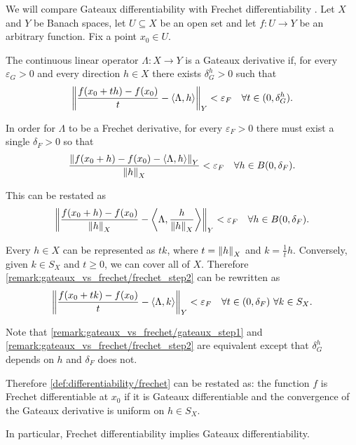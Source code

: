 \begin{remark}\label{remark:gateaux_vs_frechet}
  We will compare Gateaux differentiability with Frechet differentiability . Let \( X \) and \( Y \) be Banach spaces, let \( U \subseteq X \) be an open set and let \( f: U \to Y \) be an arbitrary function. Fix a point \( x_0 \in U \).

  The continuous linear operator \( \Lambda: X \to Y \) is a Gateaux derivative if, for every \( \varepsilon_G > 0 \) and every direction \( h \in X \) there exists \( \delta_G^h > 0 \) such that
  \begin{equation}\label{remark:gateaux_vs_frechet/gateaux_step1}
    \left\Vert \frac {f(x_0 + th) - f(x_0)} t - \left\langle \Lambda, h \right\rangle \right\Vert_Y < \varepsilon_F \quad\forall t \in (0, \delta_G^h).
  \end{equation}

  In order for \( \Lambda \) to be a Frechet derivative, for every \( \varepsilon_F > 0 \) there must exist a single \( \delta_F > 0 \) so that
  \begin{equation}\label{remark:gateaux_vs_frechet/frechet_step1}
    \frac{\left\Vert f(x_0 + h) - f(x_0) - \left\langle \Lambda, h \right\rangle \right\Vert_Y} {\left\Vert h \right\Vert_X} < \varepsilon_F \quad\forall h \in B(0, \delta_F).
  \end{equation}

  This can be restated as
  \begin{equation}\label{remark:gateaux_vs_frechet/frechet_step2}
    \left\Vert \frac {f(x_0 + h) - f(x_0)} {\left\Vert h \right\Vert_X} - \left\langle \Lambda, \frac {h} {\left\Vert h \right\Vert_X} \right\rangle \right\Vert_Y < \varepsilon_F \quad\forall h \in B(0, \delta_F).
  \end{equation}

  Every \( h \in X \) can be represented as \( t k \), where \( t = \left\Vert h \right\Vert_X \) and \( k = \tfrac 1 t h \). Conversely, given \( k \in S_X \) and \( t \geq 0 \), we can cover all of \( X \). Therefore \cref{remark:gateaux_vs_frechet/frechet_step2} can be rewritten as
  \begin{equation}\label{remark:gateaux_vs_frechet/frechet_step3}
    \left\Vert \frac {f(x_0 + tk) - f(x_0)} t - \left\langle \Lambda, k \right\rangle \right\Vert_Y < \varepsilon_F \quad\forall t \in (0, \delta_F) \ \forall k \in S_X.
  \end{equation}

  Note that \cref{remark:gateaux_vs_frechet/gateaux_step1} and \cref{remark:gateaux_vs_frechet/frechet_step2} are equivalent except that \( \delta_G^h \) depends on \( h \) and \( \delta_F \) does not.

  Therefore \cref{def:differentiability/frechet} can be restated as: the function \( f \) is Frechet differentiable at \( x_0 \) if it is Gateaux differentiable and the convergence of the Gateaux derivative is uniform on \( h \in S_X \).

  In particular, Frechet differentiability implies Gateaux differentiability.
\end{remark}
